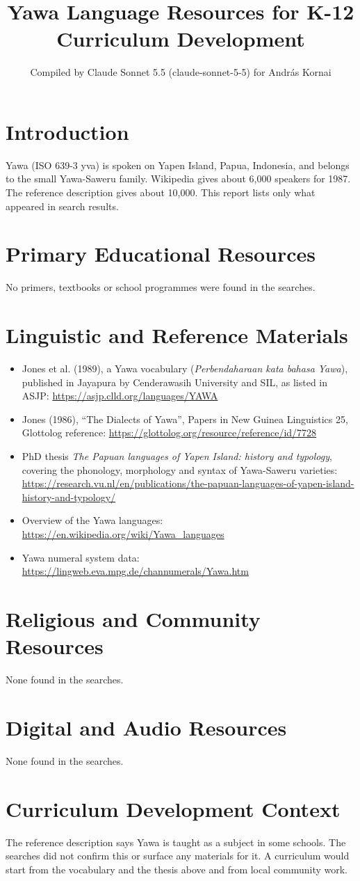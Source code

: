 \documentclass[12pt]{article}
\title{Yawa Language Resources for K-12 Curriculum Development}
\author{Compiled by Claude Sonnet 5.5 (claude-sonnet-5-5) for Andr\'as Kornai}
\date{}
\begin{document}
\maketitle

\section{Introduction}
Yawa (ISO 639-3 yva) is spoken on Yapen Island, Papua, Indonesia, and belongs to the small Yawa-Saweru family. Wikipedia gives about 6,000 speakers for 1987. The reference description gives about 10,000. This report lists only what appeared in search results.

\section{Primary Educational Resources}
No primers, textbooks or school programmes were found in the searches.

\section{Linguistic and Reference Materials}
\begin{itemize}
\item Jones et al. (1989), a Yawa vocabulary (\emph{Perbendaharaan kata bahasa Yawa}), published in Jayapura by Cenderawasih University and SIL, as listed in ASJP: \url{https://asjp.clld.org/languages/YAWA}
\item Jones (1986), ``The Dialects of Yawa'', Papers in New Guinea Linguistics 25, Glottolog reference: \url{https://glottolog.org/resource/reference/id/7728}
\item PhD thesis \emph{The Papuan languages of Yapen Island: history and typology}, covering the phonology, morphology and syntax of Yawa-Saweru varieties: \url{https://research.vu.nl/en/publications/the-papuan-languages-of-yapen-island-history-and-typology/}
\item Overview of the Yawa languages: \url{https://en.wikipedia.org/wiki/Yawa_languages}
\item Yawa numeral system data: \url{https://lingweb.eva.mpg.de/channumerals/Yawa.htm}
\end{itemize}

\section{Religious and Community Resources}
None found in the searches.

\section{Digital and Audio Resources}
None found in the searches.

\section{Curriculum Development Context}
The reference description says Yawa is taught as a subject in some schools. The searches did not confirm this or surface any materials for it. A curriculum would start from the vocabulary and the thesis above and from local community work.
\end{document}
